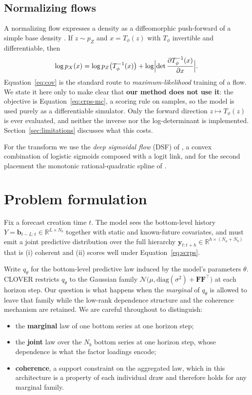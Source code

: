 \documentclass[11pt]{article}
\newcommand{\Nb}{N_{b}}
\newcommand{\Na}{N_{a}}
\newcommand{\bvec}{\mathbf{b}}
\newcommand{\yvec}{\mathbf{y}}
\newcommand{\Fmat}{\mathbf{F}}
\newcommand{\Real}{\mathbb{R}}
\begin{document}
\subsection{Normalizing flows}
A normalizing flow expresses a density as a diffeomorphic push-forward of a simple
base density \citep{rezende2015nf,papamakarios2021nf}. If $z \sim p_Z$ and
$x = T_\phi(z)$ with $T_\phi$ invertible and differentiable, then
\begin{equation}
\log p_X(x) = \log p_Z\bigl(T^{-1}_\phi(x)\bigr)
+ \log\Bigl|\det \frac{\partial T^{-1}_\phi(x)}{\partial x}\Bigr| .
\label{eq:cov}
\end{equation}
Equation~\eqref{eq:cov} is the standard route to \emph{maximum-likelihood} training
of a flow. We state it here only to make clear that \textbf{our method does not use
it}: the objective is Equation~\eqref{eq:crps-mc}, a scoring rule on samples, so the
model is used purely as a differentiable simulator. Only the forward direction
$z \mapsto T_\phi(z)$ is ever evaluated, and neither the inverse nor the
log-determinant is implemented. Section~\ref{sec:limitations} discusses what this
costs.

For the transform we use the \emph{deep sigmoidal flow} (DSF) of
\citet{huang2018naf}, a convex combination of logistic sigmoids composed with a
logit link, and for the second placement the monotonic rational-quadratic spline of
\citet{durkan2019nsf}.

\section{Problem formulation}

Fix a forecast creation time $t$. The model sees the bottom-level history
$Y = \bvec_{t-L:t} \in \Real^{L \times \Nb}$ together with static and known-future
covariates, and must emit a joint predictive distribution over the full hierarchy
$\yvec_{t:t+h} \in \Real^{h \times (\Na+\Nb)}$ that is (i) coherent and (ii) scores
well under Equation~\eqref{eq:scrps}.

Write $q_\theta$ for the bottom-level predictive law induced by the model's
parameters $\theta$. CLOVER restricts $q_\theta$ to the Gaussian family
$\mathcal{N}\bigl(\mu, \mathrm{diag}(\sigma^2) + \Fmat\Fmat^{\!\top}\bigr)$ at each
horizon step. Our question is what happens when the \emph{marginal} of $q_\theta$ is
allowed to leave that family while the low-rank dependence structure and the
coherence mechanism are retained. We are careful throughout to distinguish:
\begin{itemize}
\item the \textbf{marginal} law of one bottom series at one horizon step;
\item the \textbf{joint} law over the $\Nb$ bottom series at one horizon step, whose
dependence is what the factor loadings encode;
\item \textbf{coherence}, a support constraint on the aggregated law, which in this
architecture is a property of each individual draw and therefore holds for any
marginal family.
\end{itemize}
\end{document}
